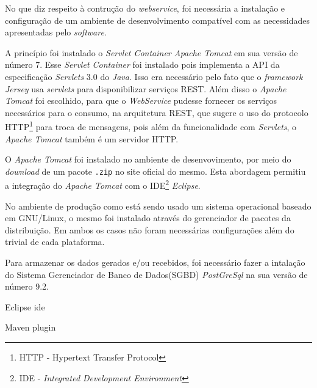 
	\par No que diz respeito à contrução do \textit{webservice}, foi necessária a
instalação e configuração de um ambiente de desenvolvimento compatível com as
necessidades apresentadas pelo \textit{software}. 

	\par A princípio foi instalado o \textit{Servlet Container Apache Tomcat} em
sua versão de número 7. Esse \textit{Servlet Container} foi instalado pois
implementa a API da especificação \textit{Servlets} 3.0 do \textit{Java}. Isso
era necessário pelo fato que o \textit{framework Jersey} usa \textit{servlets}
para disponibilizar serviços REST. Além disso o \textit{Apache Tomcat} foi
escolhido, para que o \textit{WebService} pudesse fornecer os serviços
necessários para o consumo, na arquitetura REST, que sugere o uso do protocolo
HTTP\footnote{HTTP - Hypertext Transfer Protocol} para troca de mensagens, pois
além da funcionalidade com \textit{Servlets}, o \textit{Apache Tomcat} também é
um servidor HTTP.
	
	\par O \textit{Apache Tomcat} foi instalado no ambiente de desenvovimento, por
meio do \textit{download} de um pacote \texttt{.zip} no site oficial do mesmo.
Esta abordagem permitiu a integração do \textit{Apache Tomcat} com o
IDE\footnote{IDE - \textit{Integrated Development Environment}}
\textit{Eclipse}.

	\par No ambiente de produção como está sendo usado um sistema operacional
baseado em GNU/Linux, o mesmo foi instalado através do gerenciador de pacotes
da distribuição. Em ambos os casos não foram necessárias configurações além do
trivial de cada plataforma.
			
	\par Para armazenar os dados gerados e/ou recebidos, foi necessário fazer a
intalação do Sistema Gerenciador de Banco de Dados(SGBD) \textit{PostGreSql} na
sua versão de número 9.2.

	\par Eclipse ide 
	\par Maven plugin